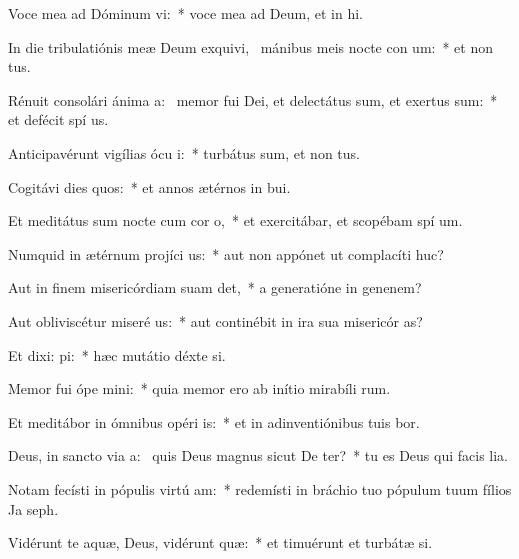 \item Voce mea ad Dóminum vi:~* voce mea ad Deum, et in hi.
\item In die tribulatiónis meæ Deum exquivi,~\pscross{} mánibus meis nocte con um:~* et non  tus.
\item Rénuit consolári ánima a:~\pscross{} memor fui Dei, et delectátus sum, et exertus sum:~* et defécit spí us.
\item Anticipavérunt vigílias ócu i:~* turbátus sum, et non  tus.
\item Cogitávi dies quos:~* et annos ætérnos in  bui.
\item Et meditátus sum nocte cum cor o,~* et exercitábar, et scopébam spí um.
\item Numquid in ætérnum projíci us:~* aut non appónet ut complacíti  huc?
\item Aut in finem misericórdiam suam det,~* a generatióne in genenem?
\item Aut obliviscétur miseré us:~* aut continébit in ira sua misericór as?
\item Et dixi:  pi:~* hæc mutátio déxte si.
\item Memor fui ópe mini:~* quia memor ero ab inítio mirabíli rum.
\item Et meditábor in ómnibus opéri is:~* et in adinventiónibus tuis bor.
\item Deus, in sancto via a:~\pscross{} quis Deus magnus sicut De ter?~* tu es Deus qui facis lia.
\item Notam fecísti in pópulis virtú am:~* redemísti in bráchio tuo pópulum tuum fílios Ja  seph.
\item Vidérunt te aquæ, Deus, vidérunt  quæ:~* et timuérunt et turbátæ  si.
